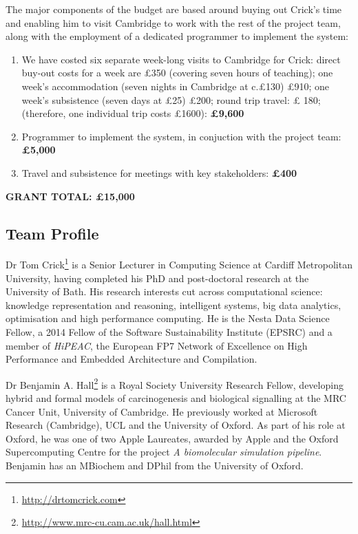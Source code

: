 \documentclass[a4paper,11pt]{article}
\begin{document}
The major components of the budget are based around buying out Crick's
time and enabling him to visit Cambridge to work with the rest of the
project team, along with the employment of a dedicated programmer to
implement the system:

\begin{enumerate}
\item We have costed six separate week-long visits to Cambridge for
Crick: direct buy-out costs for a week are \pounds 350 (covering seven
hours of teaching); one week's accommodation (seven nights in
Cambridge at c.\pounds 130) \pounds 910; one week's subsistence (seven days at \pounds 25) \pounds 200; round trip travel: \pounds
180; (therefore, one individual trip costs \pounds 1600): \hfill {\textbf{\pounds 9,600}}

\item Programmer to implement the system, in conjuction with the
  project team: \hfill {\textbf{\pounds 5,000}}

\item Travel and subsistence for meetings with key stakeholders:
  \hfill {\textbf{\pounds 400}}
\end{enumerate}

{\textbf{GRANT TOTAL: \hfill \pounds 15,000}}

\subsection*{Team Profile}

Dr Tom Crick\footnote{\url{http://drtomcrick.com}} is a Senior Lecturer in
Computing Science at Cardiff Metropolitan University, having completed
his PhD and post-doctoral research at the University of Bath. His
research interests cut across computational science: knowledge
representation and reasoning, intelligent systems, big data analytics,
optimisation and high performance computing.  He is the Nesta Data
Science Fellow, a 2014 Fellow of the Software Sustainability Institute
(EPSRC) and a member of {\emph{HiPEAC}}, the European FP7 Network of
Excellence on High Performance and Embedded Architecture and
Compilation.

Dr Benjamin A. Hall\footnote{\url{http://www.mrc-cu.cam.ac.uk/hall.html}}
is a Royal Society University Research Fellow, developing hybrid and
formal models of carcinogenesis and biological signalling at the MRC
Cancer Unit, University of Cambridge. He previously worked at
Microsoft Research (Cambridge), UCL and the University of Oxford. As
part of his role at Oxford, he was one of two Apple
Laureates, awarded by Apple and the Oxford Supercomputing Centre for
the project {\emph{A biomolecular simulation pipeline}}. Benjamin has an
MBiochem and DPhil from the University of Oxford.
\end{document}
